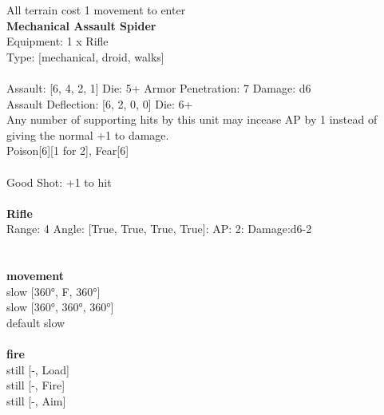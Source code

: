 \noindent All terrain cost 1 movement to enter\\ 


{\bf Mechanical Assault Spider } \\
Equipment: 1 x Rifle \\
Type: [mechanical, droid, walks] \\
\ \\
Assault: [6, 4, 2, 1] Die: 5+ Armor Penetration: 7 Damage: d6 \\
Assault Deflection: [6, 2, 0, 0] Die: 6+\\
\indent Any number of supporting hits by this unit may incease AP by 1 instead of giving the normal +1 to damage.\\ 
Poison[6][1 for 2], Fear[6]\\ 
 
\ \\
Good Shot: +1 to hit\\ 

\ \\
{\bf Rifle } \\



Range: 4  Angle: [True, True, True, True]: AP: 2: Damage:d6-2 \\




 
\ \\




\ \\ {\bf movement } \\
slow [360°, F, 360°] \\
slow [360°, 360°, 360°] \\
default slow \\
\ \\ {\bf fire } \\
still [-, Load] \\
still [-, Fire] \\
still [-, Aim] \\


